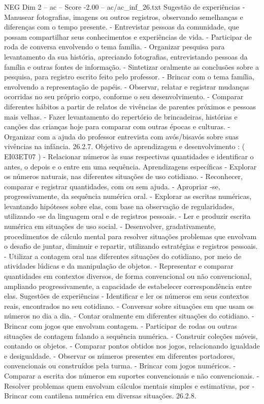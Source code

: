 \begin{textsample}{NEG Dim 2 – ac – Score -2.00 – ac/ac\_inf\_26.txt}
Sugestão de experiências - Manusear fotografias, imagens ou outros registros, observando semelhanças e diferenças com o tempo presente. - Entrevistar pessoas da comunidade, que possam compartilhar seus conhecimentos e experiências de vida. - Participar de roda de conversa envolvendo o tema família. - Organizar pesquisa para levantamento da sua história, apreciando fotografias, entrevistando pessoas da família e outras fontes de informação. - Sintetizar oralmente as conclusões sobre a pesquisa, para registro escrito feito pelo professor. - Brincar com o tema família, envolvendo a representação de papéis. - Observar, relatar e registrar mudanças ocorridas no seu próprio corpo, conforme o seu desenvolvimento. - Comparar diferentes hábitos a partir de relatos de vivências de parentes próximos e pessoas mais velhas. - Fazer levantamento do repertório de brincadeiras, histórias e canções das crianças hoje para comparar com outras épocas e culturas. - Organizar com a ajuda do professor entrevista com avós/bisavós sobre suas vivências na infância. 26.2.7.
Objetivo de aprendizagem e desenvolvimento : ( EI03ET07 ) - Relacionar números às suas respectivas quantidades e identificar o antes, o depois e o entre em uma sequência.
Aprendizagens específicas - Explorar os números naturais, nas diferentes situações de uso cotidiano. - Reconhecer, comparar e registrar quantidades, com ou sem ajuda. - Apropriar -se, progressivamente, da sequência numérica oral. - Explorar as escritas numéricas, levantando hipóteses sobre elas, com base na observação de regularidades, utilizando -se da linguagem oral e de registros pessoais. - Ler e produzir escrita numérica em situações de uso social. - Desenvolver, gradativamente, procedimentos de cálculo mental para resolver situações problemas que envolvam o desafio de juntar, diminuir e repartir, utilizando estratégias e registros pessoais. - Utilizar a contagem oral nas diferentes situações do cotidiano, por meio de atividades lúdicas e da manipulação de objetos. - Representar e comparar quantidades em contextos diversos, de forma convencional ou não convencional, ampliando progressivamente, a capacidade de estabelecer correspondência entre elas.
Sugestões de experiências - Identificar e ler os números em seus contextos reais, encontrados no seu cotidiano. - Conversar sobre situações em que usam os números no dia a dia. - Contar oralmente em diferentes situações do cotidiano. - Brincar com jogos que envolvam contagem. - Participar de rodas ou outras situações de contagem falando a sequência numérica. - Construir coleções móveis, contando os objetos. - Comparar pontos obtidos nos jogos, relacionando igualdade e desigualdade. - Observar os números presentes em diferentes portadores, convencionais ou construídos pela turma. - Brincar com jogos numéricos. - Comparar a escrita dos números em suportes convencionais e não convencionais. - Resolver problemas quem envolvam cálculos mentais simples e estimativas, por - Brincar com cantilena numérica em diversas situações. 26.2.8.

\end{textsample}
